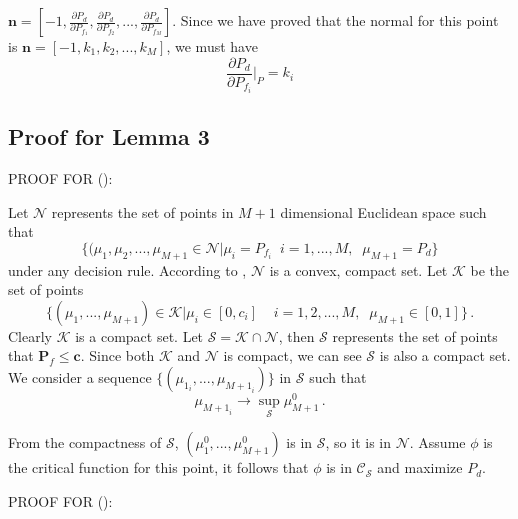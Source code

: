 \documentclass[12pt,journal,a4paper,twoside,onecolumn]{IEEEtran}
\newcommand{\rmnum}[1]{\romannumeral #1}
\begin{document}
\begin{spacing}{2.5}
 $\mathbf{n} = [-1, \frac{\partial P_d}{\partial P_{f_1}}, \frac{\partial P_d}{\partial P_{f_2}}, ..., \frac{\partial P_d}{\partial P_{f_M}}]$. Since we have proved that  the normal for this point is $\mathbf{n} = [-1, k_1, k_2, ..., k_M]$, we must have
\begin{equation}
\frac{\partial P_d}{\partial P_{f_i}}\bigg|_{P} = k_i
\end{equation}


\subsection{Proof for Lemma 3}
PROOF FOR (\rmnum{1}):

Let $\mathcal{N}$ represents the set of points in $M+1$ dimensional Euclidean space such that  
\[
\{(\mu_1, \mu_2, ..., \mu_{M+1}\in \mathcal{N} | \mu_i = P_{f_i}\;\;i=1, ..., M,\;\;\mu_{M+1}=P_d\}
\]
 under any decision rule. According to \cite{LehmannTest}, $\mathcal{N}$ is a convex, compact set.
Let $\mathcal{K}$ be the set of points 
\[
\{(\mu_1, ..., \mu_{M+1})\in \mathcal{K} | \mu_i \in [0, c_i]\;\;\;\;i=1, 2, ..., M,\;\; \mu_{M+1} \in [0,1]\}\,.
\]
Clearly $\mathcal{K}$ is a compact set. Let $\mathcal{S} = \mathcal{K} \cap \mathcal{N}$, then $\mathcal{S}$ represents the set of points that $\mathbf{P}_f \leq \mathbf{c}$. Since both $\mathcal{K}$ and $\mathcal{N}$ is compact, we can see $\mathcal{S}$ is also a compact set. 
We consider a sequence $\{(\mu_{1_i}, ..., \mu_{{M+1}_i})\}$ in $\mathcal{S}$ such that 
\[
\mu_{{M+1}_i} \rightarrow \sup_{\mathcal{S}} \mu_{M+1}^0\,.
\]

From the compactness of $\mathcal{S}$, $(\mu_1^0, ..., \mu_{M+1}^0)$ is in $\mathcal{S}$, so it is in $\mathcal{N}$. Assume $\phi$ is the critical function for this point, it follows that $\phi$ is in $\mathcal{C}_\mathcal{S}$ and maximize $P_d$.

PROOF FOR (\rmnum{2}):


\end{spacing}
\end{document}
